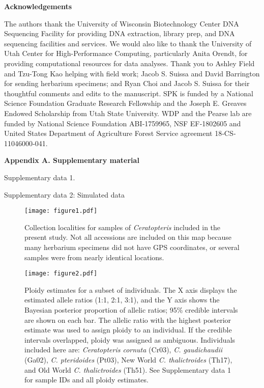\documentclass[12pt]{article}
\begin{document}
\begin{flushleft}
\vspace{1cm}

{\large\textbf{Acknowledgements}}

The authors thank the University of Wisconsin Biotechnology Center DNA Sequencing Facility for providing DNA extraction, library prep, and DNA sequencing facilities and services. We would also like to thank the University of Utah Center for High-Performance Computing, particularly Anita Orendt, for providing computational resources for data analyses. Thank you to Ashley Field and Tzu-Tong Kao helping with field work; Jacob S. Suissa and David Barrington for sending herbarium specimens; and Ryan Choi and Jacob S. Suissa for their thoughtful comments and edits to the manuscript. SPK is funded by a National Science Foundation Graduate Research Fellowship and the Joseph E. Greaves Endowed Scholarship from Utah State University. WDP and the Pearse lab are funded by National Science Foundation ABI‐1759965, NSF EF‐1802605 and United States Department of Agriculture Forest Service agreement 18‐CS‐11046000‐041.

\vspace{1cm}

{\large\textbf{Appendix A. Supplementary material}}

Supplementary data 1.

Supplementary data 2: Simulated data

\end{flushleft}
\vspace{30cm}

\begin{figure}[H]
\centering
\texttt{[image: figure1.pdf]}
\caption{Collection localities for samples of \textit{Ceratopteris} included in the present study. Not all accessions are included on this map because many herbarium specimens did not have GPS coordinates, or several samples were from nearly identical locations.}
\label{map}
\end{figure}

\begin{figure}[H]
\centering
\texttt{[image: figure2.pdf]}
\caption{Ploidy estimates for a subset of individuals. The X axis displays the estimated allele ratios (1:1, 2:1, 3:1), and the Y axis shows the Bayesian posterior proportion of allelic ratios; 95\% credible intervals are shown on each bar. The allelic ratio with the highest posterior estimate was used to assign ploidy to an individual. If the credible intervals overlapped, ploidy was assigned as ambiguous. Individuals included here are: \textit{Ceratopteris cornuta} (Cr03), \textit{C. gaudichaudii} (Ga02), \textit{C. pteridoides} (Pt03), New World \textit{C. thalictroides} (Th17), and Old World \textit{C. thalictroides} (Th51). See Supplementary data 1 for sample IDs and all ploidy estimates.}
\label{g2p}
\end{figure}
\end{document}
